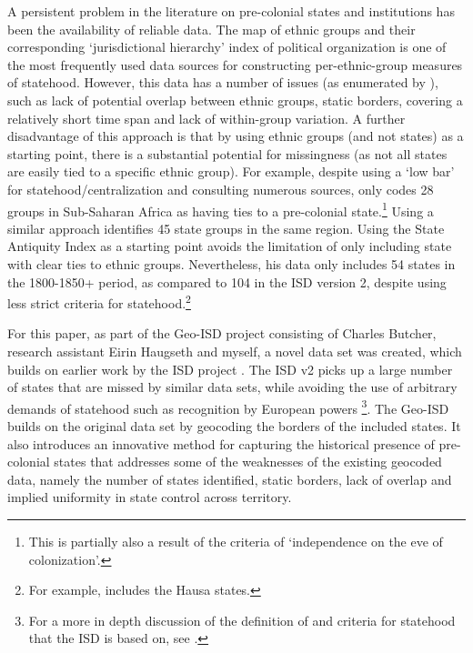 \documentclass[12pt]{article}
\begin{document}
A persistent problem in the literature on pre-colonial states and institutions
has been the availability of reliable data. The \citet{Murdock1967} map of
ethnic groups and their corresponding `jurisdictional hierarchy' index of
political organization is one of the most frequently used data sources for
constructing per-ethnic-group measures of statehood. However, this data has a
number of issues (as enumerated by \citet{Michalopoulos2018}), such as lack of
potential overlap between ethnic groups, static borders, covering a relatively
short time span and lack of within-group variation. A further disadvantage of
this approach is that by using ethnic groups (and not states) as a starting
point, there is a substantial potential for missingness (as not all states are
easily tied to a specific ethnic group). For example, \citet{Paine2019} despite
using a `low bar' for statehood/centralization and consulting numerous sources,
only codes 28 groups in Sub-Saharan Africa as having ties to a pre-colonial
state.\footnote{This is partially also a result of the criteria of `independence
on the eve of colonization'.} Using a similar approach \citet{Wig2016}
identifies 45 state groups in the same region. Using the State Antiquity Index
\citep{Bockstette2012} as a starting point \citet{Depetris-Chauvin2016} avoids
the limitation of only including state with clear ties to ethnic groups.
Nevertheless, his data only includes 54 states in the 1800-1850+ period, as
compared to 104 in the ISD version 2, despite using less strict
criteria for statehood.\footnote{For example, \citet{Depetris-Chauvin2016}
includes the Hausa states.}


For this paper, as part of the Geo-ISD project consisting of Charles Butcher,
research assistant Eirin Haugseth and myself, a novel data set was created,
which builds on earlier work by the ISD project \citep{Butcher2020}. The ISD v2
picks up a large number of states that are missed by similar data sets, while
avoiding the use of arbitrary demands of statehood such as recognition by
European powers \citep{Butcher2020}\footnote{For a more in depth discussion of
	the definition of and criteria for statehood that the ISD is based on,
see \citet{Butcher2017}.}. The Geo-ISD builds on the original data set by
geocoding the borders of the included states. It also introduces an innovative
method for capturing the historical presence of pre-colonial states that
addresses some of the weaknesses of the existing geocoded data, namely the
number of states identified, static borders, lack of overlap and implied
uniformity in state control across territory.
\end{document}
